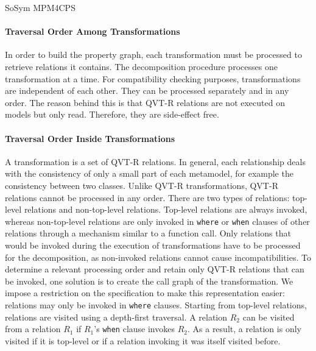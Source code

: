 \begin{copiedFrom}{SoSym MPM4CPS}

\paragraph{Traversal Order Among Transformations}
In order to build the property graph, each transformation must be processed to retrieve relations it contains. The decomposition procedure processes one transformation at a time. For compatibility checking purposes, transformations are independent of each other. They can be processed separately and in any order. The reason behind this is that QVT-R relations are not executed on models but only read. Therefore, they are side-effect free.

\paragraph{Traversal Order Inside Transformations}
A transformation is a set of QVT-R relations. In general, each relationship deals with the consistency of only a small part of each metamodel, for example the consistency between two classes. 
Unlike QVT-R transformations, QVT-R relations cannot be processed in any order. There are two types of relations: top-level relations and non-top-level relations. 
Top-level relations are always invoked, whereas non-top-level relations are only invoked in \texttt{where} or \texttt{when} clauses of other relations through a mechanism similar to a function call. Only relations that would be invoked during the execution of transformations have to be processed for the decomposition, as non-invoked relations cannot cause incompatibilities. To determine a relevant processing order and retain only QVT-R relations that can be invoked, one solution is to create the call graph of the transformation.
We impose a restriction on the specification to make this representation easier: relations may only be invoked in \texttt{where} clauses. Starting from top-level relations, relations are visited using a depth-first traversal. A relation $R_2$ can be visited from a relation $R_1$ if $R_1$'s \texttt{when} clause invokes $R_2$. As a result, a relation is only visited if it is top-level or if a relation invoking it was itself visited before.


\end{copiedFrom}
